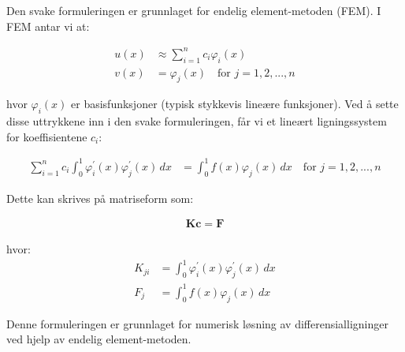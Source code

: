 \documentclass[../main.tex]{subfiles}
\begin{document}
Den svake formuleringen er grunnlaget for endelig element-metoden (FEM).
I FEM antar vi at:

\begin{align*}
    u(x) & \approx \sum_{i=1}^n c_i \varphi_i(x)        \\
    v(x) & = \varphi_j(x) \quad \text{for } j=1,2,...,n
\end{align*}

hvor $\varphi_i(x)$ er basisfunksjoner (typisk stykkevis lineære funksjoner). Ved å sette disse uttrykkene inn i den svake formuleringen, får vi et lineært ligningssystem for koeffisientene $c_i$:

\begin{align*}
    \sum_{i=1}^n c_i \int_0^1 \varphi_i^{\prime}(x) \varphi_j^{\prime}(x) \, dx & = \int_0^1 f(x) \varphi_j(x) \, dx \quad \text{for } j=1,2,...,n
\end{align*}

Dette kan skrives på matriseform som:

\begin{align*}
    \mathbf{K} \mathbf{c} = \mathbf{F}
\end{align*}

hvor:
\begin{align*}
    K_{ji} & = \int_0^1 \varphi_i^{\prime}(x) \varphi_j^{\prime}(x) \, dx \\
    F_j    & = \int_0^1 f(x) \varphi_j(x) \, dx
\end{align*}

Denne formuleringen er grunnlaget for numerisk løsning av differensialligninger ved hjelp av endelig element-metoden.
\end{document}
